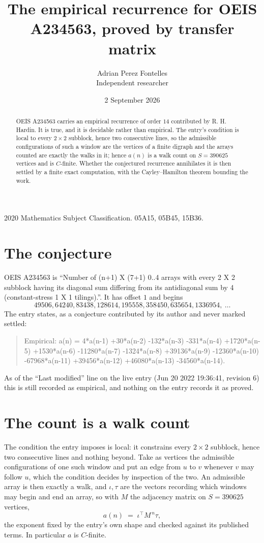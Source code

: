 \documentclass[11pt,a4paper]{article}
\title{The empirical recurrence for OEIS A234563, proved by transfer matrix}
\author{Adrian Perez Fontelles\\ \small Independent researcher}
\date{2 September 2026}
\theoremstyle{plain}
\theoremstyle{definition}
\begin{document}
\maketitle

\begin{abstract}
OEIS A234563 carries an empirical recurrence of order $14$ contributed by R. H. Hardin. It is
true, and it is decidable rather than empirical. The entry's condition is local to every $2\times2$ subblock, hence two consecutive lines, so
the admissible configurations of such a window are the vertices of a finite digraph and the
arrays counted are exactly the walks in it; hence $a(n)$ is a walk count on $S=390625$ vertices
and is $C$-finite. Whether the conjectured recurrence annihilates it is then settled by a
finite exact computation, with the Cayley--Hamilton theorem bounding the work.
\end{abstract}

\noindent\small 2020 Mathematics Subject Classification. 05A15, 05B45, 15B36.\normalsize

\section{The conjecture}

OEIS A234563 is ``Number of (n+1) X (7+1) 0..4 arrays with every 2 X 2 subblock having its diagonal sum differing from its antidiagonal sum by 4 (constant-stress 1 X 1 tilings).''. It has offset $1$ and begins
\[
49506, 64240, 83438, 128614, 195558, 358450, 635654, 1336954,\ \dots
\]
The entry states, as a conjecture contributed by its author and never marked settled:
\begin{quote}
Empirical: a(n) = 4*a(n-1) +30*a(n-2) -132*a(n-3) -331*a(n-4) +1720*a(n-5) +1530*a(n-6) -11280*a(n-7) -1324*a(n-8) +39136*a(n-9) -12360*a(n-10) -67968*a(n-11) +39456*a(n-12) +46080*a(n-13) -34560*a(n-14).
\end{quote}
As of the ``Last modified'' line on the live entry (Jun 20 2022 19:36:41, revision 6) this is still
recorded as empirical, and nothing on the entry records it as proved.

\section{The count is a walk count}

The condition the entry imposes is local: it constrains every $2\times2$ subblock, hence two consecutive lines and nothing beyond. Take as vertices the admissible configurations of one such window and put an edge from $u$ to $v$ whenever $v$ may follow $u$, which the condition decides by inspection of the two.
An admissible array is then exactly a walk, and $\iota,\tau$ are the vectors recording which windows may begin and end an array, so with $M$ the adjacency matrix on $S=390625$ vertices,
\[
a(n)\;=\;\iota^{\!\top}M^{\,n}\tau ,
\]
the exponent fixed by the entry's own shape and checked against its published terms. In
particular $a$ is $C$-finite.
\end{document}
